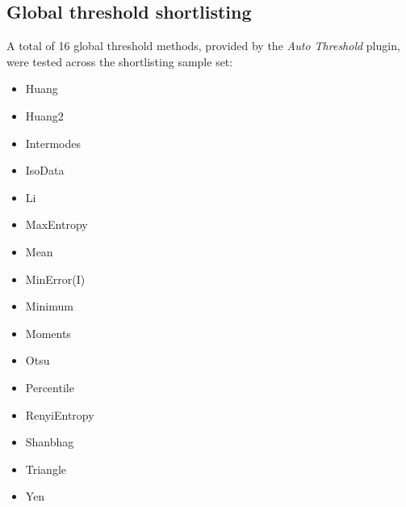 \clearpage
\subsection{Global threshold shortlisting} 
A total of 16 global threshold methods, provided by the \textit{Auto Threshold} plugin, were tested across the shortlisting sample set:
\begin{multicols}{4}
	\begin{itemize}
		\setlength\itemsep{1mm}
		\item Huang
		\item Huang2
		\item Intermodes
		\item IsoData
		\item Li
		\item MaxEntropy
		\item Mean
		\item MinError(I)
		\item Minimum
		\item Moments
		\item Otsu
		\item Percentile
		\item RenyiEntropy
		\item Shanbhag
		\item Triangle
		\item Yen
	\end{itemize}
\end{multicols}
